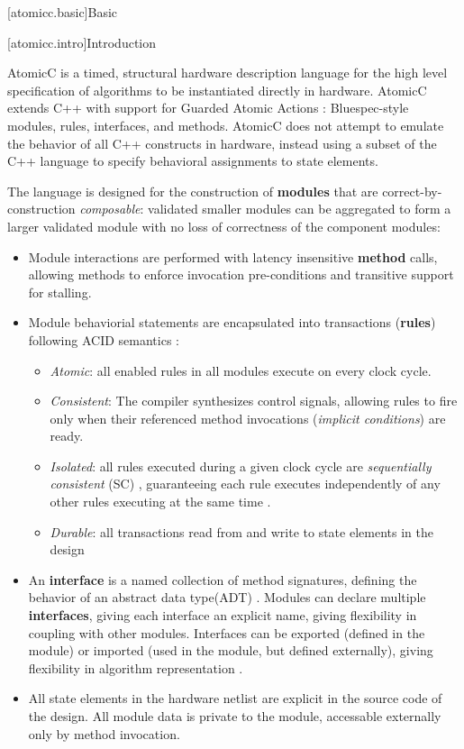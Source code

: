 [atomicc.basic]{Basic}

[atomicc.intro]{Introduction}

AtomicC is a timed, structural hardware description language for
the high level specification of algorithms to be instantiated
directly in hardware.
AtomicC extends C++
with support for Guarded Atomic Actions
\cite{Hoe:Thesis,HoeArvind:TRS_Synthesis2,Dave2007}:
Bluespec-style\cite{Bluespec:www}
modules, rules, interfaces, and methods.
AtomicC does not attempt to emulate the behavior of all C++ constructs in hardware,
instead using a subset of the C++ language to specify behavioral
assignments to state elements.

The language is designed for
the construction of \textbf{modules} that are correct-by-construction \textit{composable}:
validated smaller modules can be aggregated to form
a larger validated module with
no loss of correctness of the component modules:
\begin{itemize}
\item Module interactions are performed with
latency insensitive\cite{Ng2010,AbbasB18}
\textbf{method} calls, allowing methods to enforce invocation pre-conditions
and transitive support for stalling.
\item Module behaviorial statements are encapsulated into transactions (\textbf{rules})
following ACID semantics
\cite{NikhilSemantics,GrayR93}:
\begin{itemize}
\item \textit{Atomic}: all enabled rules in all modules execute on every clock cycle.
\item \textit{Consistent}: The compiler synthesizes control signals, allowing rules to fire
only when their referenced method invocations (\textit{implicit conditions})
are ready.
\item \textit{Isolated}: all rules executed during a given clock cycle are
\textit{sequentially consistent} (SC) \cite{Lamport:1979:MMC:1311099.1311750},
guaranteeing each rule executes
independently of any other rules executing at the same time
\cite[Sec.~7.1]{GrayR93}.
\item \textit{Durable}: all transactions read from and write to state elements in the design
\end{itemize}

\item An \textbf{interface} is a named collection of method signatures, defining
the behavior of an abstract data type(ADT) \cite{Liskov74programmingwith}.
Modules can declare
multiple \textbf{interfaces}, giving each interface an explicit name,
giving flexibility in coupling with other modules.
Interfaces can be exported (defined in the module) or imported (used in
the module, but defined externally), giving flexibility in algorithm
representation \cite[Sec.~4.1]{Dave:ROB}.
\item All state elements in the hardware
netlist are explicit in the source code of the design.
All module data is private to the module, accessable externally only by method invocation.
\end{itemize}
